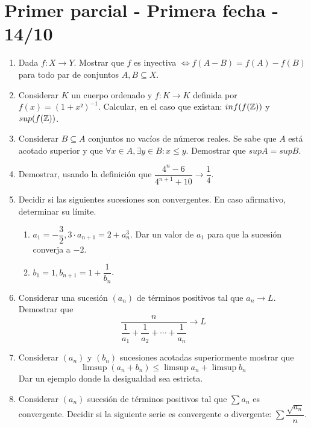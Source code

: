 \section{Primer parcial - Primera fecha - 14/10}

\begin{enumerate}
  \item Dada $f: X \to Y$. Mostrar que $f$ es inyectiva $\iff f(A-B) = f(A) - f(B)$ para todo par de conjuntos $A, B \subseteq X$.
  \item Considerar $K$ un cuerpo ordenado y $f: K \to K$ definida por $f(x) = (1+x²)^{-1}$. Calcular, en el caso que existan: $inf(f(\mathbb{Z}))$ y $sup(f(\mathbb{Z}))$.
  \item Considerar $B \subseteq A$ conjuntos no vacíos de números reales. Se sabe que $A$ está acotado superior y que $\forall x \in A, \exists y \in B : x \leq y$. Demostrar que $sup A = sup B$.
  \item Demostrar, usando la definición que $\dfrac{4^n - 6}{4^{n+1}+10} \to \dfrac{1}{4}$.
  \item Decidir si las siguientes sucesiones son convergentes. En caso afirmativo, determinar su límite. \begin{enumerate}
          \item $a_1 = -\dfrac{3}{2}, 3 \cdot a_{n+1} = 2 + a_n^3$. Dar un valor de $a_1$ para que la sucesión converja a $-2$.
          \item $b_1 = 1, b_{n+1} = 1 + \dfrac{1}{b_n}$.
        \end{enumerate}
  \item Considerar una sucesión $(a_n)$ de términos positivos tal que $a_n \to L$. Demostrar que \begin{equation} \dfrac{n}{\dfrac{1}{a_1} + \dfrac{1}{a_2} + \cdots + \dfrac{1}{a_n}} \to L \end{equation}
  \item Considerar $(a_n)$ y $(b_n)$ sucesiones acotadas superiormente mostrar que \begin{equation} \limsup(a_n + b_n) \leq \limsup a_n + \limsup b_n \end{equation} Dar un ejemplo donde la desigualdad sea estricta.
  \item Considerar $(a_n)$ sucesión de términos positivos tal que $\sum a_n$ es convergente. Decidir si la siguiente serie es convergente o divergente: $\sum \dfrac{\sqrt{a_n}}{n}$.
\end{enumerate}

\clearpage

